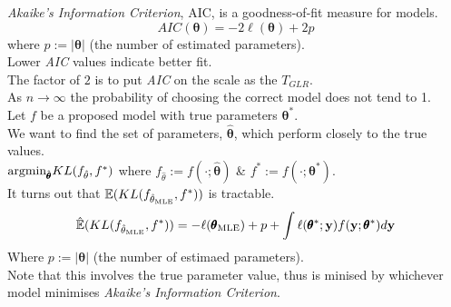 \documentclass[11pt,a4paper]{article}
\begin{document}
\textit{Akaike's Information Criterion}, AIC, is a goodness-of-fit measure for models.
$$AIC(\pmb\theta)=-2\ell(\pmb\theta)+2p$$
where $p:=|\pmb\theta|$ (the number of estimated parameters).\\
Lower \textit{AIC} values indicate better fit.\\
\nb The factor of $2$ is to put \textit{AIC} on the scale as the $T_{GLR}$.\\

As $n\to\infty$ the probability of choosing the correct model does not tend to 1.\\

Let $f$ be a proposed model with true parameters $\pmb\theta^*$.\\
We want to find the set of parameters, $\hat{\pmb\theta}$, which perform closely to the true values.\\
\ie $\text{argmin}_{\hat{\pmb\theta}}KL(f_{\hat\theta},f^*)$ where $f_{\hat\theta}:=f(\cdot;\hat{\pmb\theta})$ \& $f^*:=f(\cdot;\pmb\theta^*)$.\\
It turns out that $\mathbb{E}(KL(f_{\hat\theta_\text{MLE}},f^*))$ is tractable.
$$\hat{\mathbb{E}}(KL(f_{\hat\theta_\text{MLE}},f^*))=-\ell(\pmb\theta_\text{MLE})+p+\int\ell(\pmb\theta^*;\textbf{y})f(\textbf{y};\pmb\theta^*)d\textbf{y}$$
Where $p:=|\pmb\theta|$ (the number of estimaed parameters).\\
Note that this involves the true parameter value, thus is minised by whichever model minimises \textit{Akaike's Information Criterion}.\\
\end{document}
